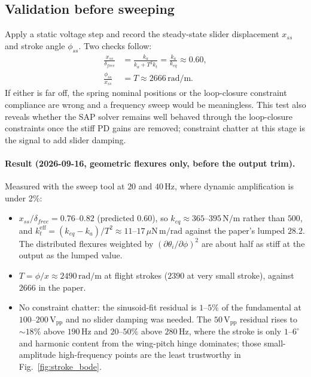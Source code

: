 \documentclass{article}
\begin{document}
\subsection{Validation before sweeping}
\label{sec:lumped_validation}
Apply a static voltage step and record the steady-state slider displacement \(x_{ss}\) and stroke angle \(\phi_{ss}\). Two checks follow:
\begin{align}
    \frac{x_{ss}}{\delta_{free}} &= \frac{k_a}{k_a + T^2 k_t} = \frac{k_a}{k_{eq}} \approx 0.60, \\
    \frac{\phi_{ss}}{x_{ss}} &= T \approx 2666\,\mathrm{rad/m}.
\end{align}
If either is far off, the spring nominal positions or the loop-closure constraint compliance are wrong and a frequency sweep would be meaningless. This test also reveals whether the SAP solver remains well behaved through the loop-closure constraints once the stiff PD gains are removed; constraint chatter at this stage is the signal to add slider damping.

\paragraph{Result (2026-09-16, geometric flexures only, before the output trim).} Measured with the sweep tool at \(20\) and \(40\,\mathrm{Hz}\), where dynamic amplification is under 2\%:
\begin{itemize}
    \item \(x_{ss}/\delta_{free} = 0.76\)--\(0.82\) (predicted 0.60), so \(k_{eq} \approx 365\)--\(395\,\mathrm{N/m}\) rather than \(500\), and \(k_t^{\mathrm{eff}} = (k_{eq} - k_a)/T^2 \approx 11\)--\(17\,\mu\mathrm{N\,m/rad}\) against the paper's lumped \(28.2\). The distributed flexures weighted by \((\partial\theta_i/\partial\phi)^2\) are about half as stiff at the output as the lumped value.
    \item \(T = \phi/x \approx 2490\,\mathrm{rad/m}\) at flight strokes (\(2390\) at very small stroke), against \(2666\) in the paper.
    \item No constraint chatter: the sinusoid-fit residual is \(1\)--\(5\%\) of the fundamental at \(100\)--\(200\,\mathrm{V_{pp}}\) and no slider damping was needed. The \(50\,\mathrm{V_{pp}}\) residual rises to \(\sim 18\%\) above \(190\,\mathrm{Hz}\) and \(20\)--\(50\%\) above \(280\,\mathrm{Hz}\), where the stroke is only \(1\)--\(6^\circ\) and harmonic content from the wing-pitch hinge dominates; those small-amplitude high-frequency points are the least trustworthy in Fig.~\ref{fig:stroke_bode}.
\end{itemize}
\end{document}
